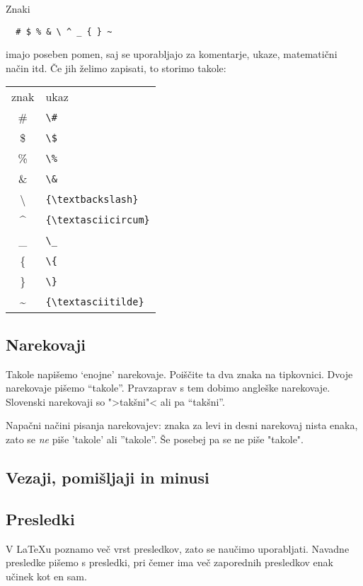 \documentclass[a4paper]{article}
\begin{document}
Znaki
%
\begin{verbatim}
  # $ % & \ ^ _ { } ~
\end{verbatim}
%
imajo poseben pomen, saj se uporabljajo za komentarje, ukaze, matematični način itd. Če
jih želimo zapisati, to storimo takole:
%
\begin{center}
\begin{tabular}{cl}
znak & ukaz \\
\# & \verb|\#| \\
\$ & \verb|\$| \\
\% & \verb|\%| \\
\& & \verb|\&| \\
{\textbackslash} & \verb|{\textbackslash}| \\
{\textasciicircum} & \verb|{\textasciicircum}| \\
\_ & \verb|\_| \\
\{ & \verb|\{| \\
\} & \verb|\}| \\
{\textasciitilde} & \verb|{\textasciitilde}| \\
\end{tabular}
\end{center}
\subsection{Narekovaji}

Takole napišemo `enojne' narekovaje. Poiščite ta dva znaka na tipkovnici. Dvoje narekovaje
pišemo ``takole''. Pravzaprav s tem dobimo angleške narekovaje. Slovenski narekovaji so
">takšni"< ali pa "`takšni"'.

Napačni načini pisanja narekovajev: znaka za levi in desni narekovaj nista enaka, zato se
\emph{ne} piše 'takole' ali ''takole''. Še posebej pa se ne piše "takole".

\subsection{Vezaji, pomišljaji in minusi}
\label{sec:vezaji-pomilj-minusi}


\subsection{Presledki}

V {\LaTeX}u poznamo več vrst presledkov, zato se naučimo uporabljati. Navadne presledke
pišemo s presledki, pri čemer ima    več      zaporednih presledkov enak učinek kot en sam.
\end{document}
